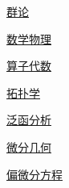 \documentclass[11pt,a4paper]{article}
\begin{document}
\noindent\hyperlink{subject5}{群论}\nobreak\hfill\pageref*{subject5}\par\vspace{5pt}
\noindent\hyperlink{subject17}{数学物理}\nobreak\hfill\pageref*{subject17}\par\vspace{5pt}
\noindent\hyperlink{subject16}{算子代数}\nobreak\hfill\pageref*{subject16}\par\vspace{5pt}
\noindent\hyperlink{subject4}{拓扑学}\nobreak\hfill\pageref*{subject4}\par\vspace{5pt}
\noindent\hyperlink{subject11}{泛函分析}\nobreak\hfill\pageref*{subject11}\par\vspace{5pt}
\noindent\hyperlink{subject7}{微分几何}\nobreak\hfill\pageref*{subject7}\par\vspace{5pt}
\noindent\hyperlink{subject9}{偏微分方程}\nobreak\hfill\pageref*{subject9}\par\vspace{5pt}

\clearpage
\end{document}
